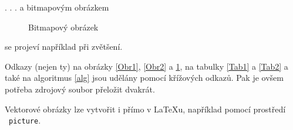 \documentclass[11pt]{article}
\begin{document}
\noindent
. . . a bitmapovým obrázkem

\begin{figure}[h]
    \centering
        \caption{ Bitmapový obrázek }
    \label{Obr3}
\end{figure}

\noindent
se projeví například při zvětšení.

Odkazy (nejen ty) na obrázky \ref{Obr1}, \ref{Obr2} a \ref{Obr3}, na  
tabulky \ref{Tab1} a \ref{Tab2} a také na algoritmus \ref{alg} jsou udělány pomocí 
křížových odkazů. Pak je ovšem potřeba zdrojový soubor přeložit dvakrát.

Vektorové obrázky lze vytvořit i přímo v \LaTeX u, například pomocí prostředí 
\ \texttt{picture}.
\end{document}
